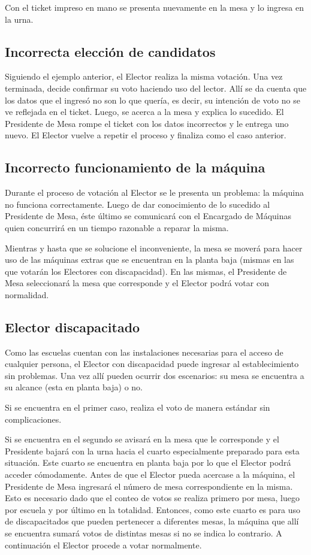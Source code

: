 \documentclass[spanish, 10pt,a4paper]{article}
\numberwithin{equation}{section} %
\begin{document}
	Con el ticket impreso en mano se presenta nuevamente en la mesa y lo ingresa en la urna.	
	
\subsection{Incorrecta elección de candidatos}
	Siguiendo el ejemplo anterior, el Elector realiza la misma votación. Una vez terminada, decide confirmar su voto haciendo uso del lector. Allí se da cuenta que los datos que el ingresó no son lo que quería, es decir, su intención de voto no se ve reflejada en el ticket. Luego, se acerca a la mesa y explica lo sucedido. El Presidente de Mesa rompe el ticket con los datos incorrectos y le entrega uno nuevo. El Elector vuelve a repetir el proceso y finaliza como el caso anterior. 

\subsection{Incorrecto funcionamiento de la máquina}
	Durante el proceso de votación al Elector se le presenta un problema: la máquina no funciona correctamente. Luego de dar conocimiento de lo sucedido al Presidente de Mesa, éste último se comunicará con el Encargado de Máquinas quien concurrirá en un tiempo razonable a reparar la misma. 

	Mientras y hasta que se solucione el inconveniente, la mesa se moverá para hacer uso de las máquinas extras que se encuentran en la planta baja  (mismas en las que votarán los Electores con discapacidad). En las mismas,  el Presidente de Mesa seleccionará la mesa que corresponde y el Elector podrá votar con normalidad.

\subsection{Elector discapacitado}
	Como las escuelas cuentan con las instalaciones necesarias para el acceso de cualquier persona, el Elector con discapacidad puede ingresar al establecimiento sin problemas. Una vez allí pueden ocurrir dos escenarios: su mesa se encuentra a su alcance (esta en planta baja) o no.
	
	Si se encuentra en el primer caso, realiza el voto de manera estándar sin complicaciones. 
	
	Si se encuentra en el segundo se avisará en la mesa que le corresponde y el Presidente bajará con la urna hacia el cuarto especialmente preparado para esta situación.	Este cuarto se encuentra en planta baja por lo que el Elector podrá acceder cómodamente. Antes de que el Elector pueda acercase a la máquina, el Presidente de Mesa ingresará el número de mesa correspondiente en la misma. Esto es necesario dado que el conteo de votos se realiza primero por mesa, luego por escuela y por último en la totalidad. Entonces, como este cuarto es para uso de discapacitados que pueden pertenecer a diferentes mesas, la máquina que allí se encuentra sumará votos de distintas mesas si no se indica lo contrario. A continuación el Elector procede a votar normalmente.
\end{document}
